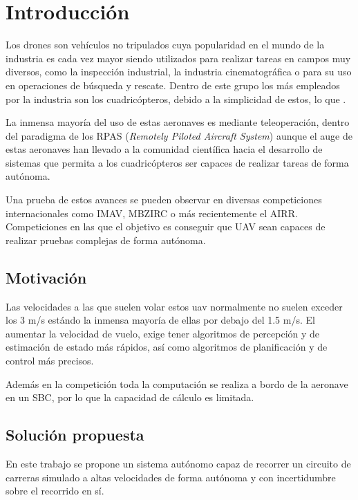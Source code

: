 \chapter{Introducción}
Los drones son vehículos no tripulados cuya popularidad en el mundo de la industria es cada vez mayor siendo utilizados para realizar tareas en campos muy diversos, como la inspección industrial, la industria cinematográfica o para su uso en operaciones de búsqueda y rescate. Dentro de este grupo los más empleados por la industria son los cuadricópteros, debido a la simplicidad de estos, lo que .

La inmensa mayoría del uso de estas aeronaves es mediante teleoperación, dentro del paradigma de los RPAS (\textit{Remotely Piloted Aircraft System}) aunque el auge de estas aeronaves han llevado a la comunidad científica hacia el desarrollo de sistemas que permita a los cuadricópteros ser capaces de realizar tareas de forma autónoma.

Una prueba de estos avances se pueden observar en diversas competiciones internacionales como IMAV, MBZIRC o más recientemente el AIRR. Competiciones en las que el objetivo es conseguir que UAV sean capaces de realizar pruebas complejas de forma autónoma.



\section{Motivación}

Las velocidades a las que suelen volar estos uav normalmente no suelen exceder los 3 m/s estándo la inmensa mayoría de ellas por debajo del 1.5 m/s. El aumentar la velocidad de vuelo, exige tener algoritmos de percepción y de estimación de estado más rápidos, así como algoritmos de planificación y de control más precisos.

Además en la competición toda la computación se realiza a bordo de la aeronave en un SBC, por lo que la capacidad de cálculo es limitada.


\section{Solución propuesta}

En este trabajo se propone un sistema autónomo capaz de recorrer un circuito de carreras 
simulado a altas velocidades de forma autónoma y con incertidumbre sobre el recorrido en sí.


